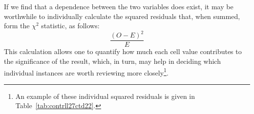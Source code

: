 If we find that a dependence between the two variables does exist, it may be worthwhile to individually calculate the squared residuals that, when summed, form the \(\chi^2\) statistic, as follows:
\[\frac{(O-E)^2}{E}\]
This calculation allows one to quantify how much each cell value contributes to the significance of the result, which, in turn, may help in deciding which individual instances are worth reviewing more closely\footnote{An example of these individual squared residuals is given in Table~\ref{tab:contrll27ctd22}.}.




